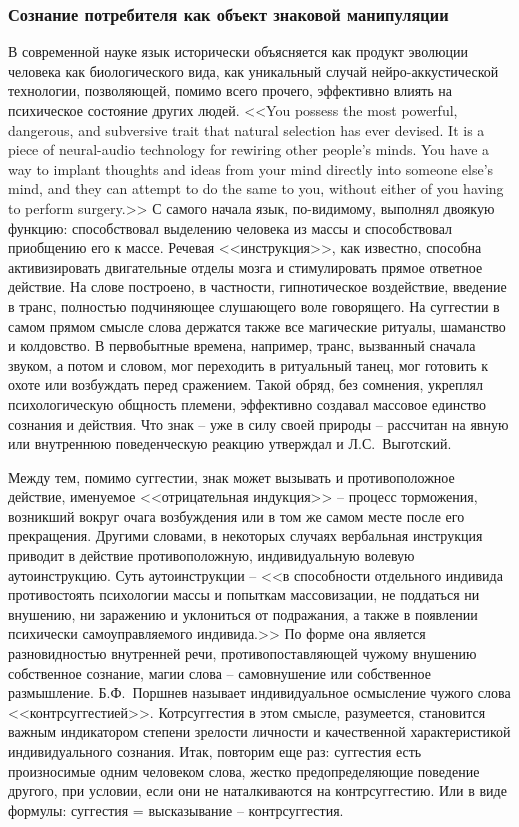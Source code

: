 \subsubsection{Сознание потребителя как объект знаковой манипуляции}
\label{2.3}
В современной науке язык исторически объясняется как продукт эволюции
человека как биологического вида, как уникальный случай нейро-аккустической технологии,
позволяющей, помимо всего прочего, эффективно влиять на психическое состояние
других людей. <<You possess the most powerful, dangerous, and subversive trait that
natural selection has ever devised. It is a piece of neural-audio technology for
rewiring other people’s minds. You have a way to implant thoughts and ideas from
your mind directly into someone else’s mind, and they can attempt to do the
same to you, without either of you having to perform surgery.>>\autocite{pagel2012wired}
С самого начала язык, по-видимому, выполнял двоякую функцию: способствовал выделению
человека из массы и способствовал приобщению его к массе. Речевая <<инструкция>>,
как известно, способна активизировать двигательные отделы мозга и стимулировать
прямое ответное действие. На слове построено, в частности, гипнотическое воздействие,
введение в транс, полностью подчиняющее слушающего воле говорящего. На суггестии
в самом прямом смысле слова держатся также все магические ритуалы, шаманство и
колдовство. В первобытные времена, например, транс, вызванный сначала звуком,
а потом и словом, мог переходить в ритуальный танец, мог готовить к охоте или
возбуждать перед сражением.\autocite{porshnev1974} Такой обряд, без сомнения,
укреплял психологическую общность племени, эффективно создавал массовое единство
сознания и действия. Что знак -- уже в силу своей природы -- рассчитан на явную или
внутреннюю поведенческую реакцию утверждал и Л.С.~Выготский.\autocite[][179]{vigotsky1956}

Между тем, помимо суггестии, знак может вызывать и противоположное действие,
именуемое <<отрицательная индукция>> -- процесс торможения, возникший вокруг очага
возбуждения или в том же самом месте после его прекращения. Другими словами,
в некоторых случаях вербальная инструкция приводит в действие противоположную,
индивидуальную волевую аутоинструкцию. Суть аутоинструкции -- <<в способности
отдельного индивида противостоять психологии массы и попыткам массовизации,
не поддаться ни внушению, ни заражению и уклониться от подражания, а также в
появлении психически самоуправляемого индивида.>>\autocite[][96]{olshansky}
По форме она является разновидностью внутренней речи, противопоставляющей чужому
внушению собственное сознание, магии слова -- самовнушение или собственное размышление.
Б.Ф.~Поршнев называет индивидуальное осмысление чужого слова <<контрсуггестией>>.\autocite{porshnev1974}
Котрсуггестия в этом смысле, разумеется, становится важным индикатором степени
зрелости личности и качественной характеристикой индивидуального сознания.
Итак, повторим еще раз: суггестия есть произносимые одним человеком слова,
жестко предопределяющие поведение другого, при условии, если они не наталкиваются
на контрсуггестию. Или в виде формулы: суггестия = высказывание -- контрсуггестия.

